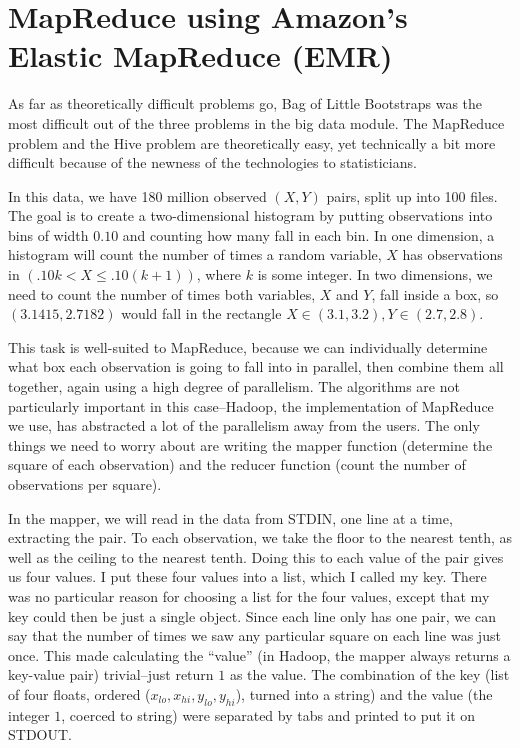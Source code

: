 \documentclass[12pt]{article}
\begin{document}
\section*{MapReduce using Amazon's Elastic MapReduce (EMR)}
As far as theoretically difficult problems go, Bag of Little Bootstraps was the most difficult out of the three problems in the big data module. The MapReduce problem and the Hive problem are theoretically easy, yet technically a bit more difficult because of the newness of the technologies to statisticians. 

In this data, we have 180 million observed $(X,Y)$ pairs, split up into 100 files. The goal is to create a two-dimensional histogram by putting observations into bins of width $0.10$ and counting how many fall in each bin. In one dimension, a histogram will count the number of times a random variable, $X$ has observations in $(.10k < X \leq .10(k+1))$, where $k$ is some integer. In two dimensions, we need to count the number of times both variables, $X$ and $Y$, fall inside a box, so $(3.1415, 2.7182)$ would fall in the rectangle $X \in (3.1, 3.2), Y \in (2.7, 2.8)$. 

This task is well-suited to MapReduce, because we can individually determine what box each observation is going to fall into in parallel, then combine them all together, again using a high degree of parallelism. The algorithms are not particularly important in this case--Hadoop, the implementation of MapReduce we use, has abstracted a lot of the parallelism away from the users. The only things we need to worry about are writing the mapper function (determine the square of each observation) and the reducer function (count the number of observations per square).

In the mapper, we will read in the data from STDIN, one line at a time, extracting the pair. To each observation, we take the floor to the nearest tenth, as well as the ceiling to the nearest tenth. Doing this to each value of the pair gives us four values. I put these four values into a list, which I called my key. There was no particular reason for choosing a list for the four values, except that my key could then be just a single object. Since each line only has one pair, we can say that the number of times we saw any particular square on each line was just once. This made calculating the ``value'' (in Hadoop, the mapper always returns a key-value pair) trivial--just return $1$ as the value. The combination of the key (list of four floats, ordered ($x_{lo}, x_{hi}, y_{lo}, y_{hi}$), turned into a string) and the value (the integer $1$, coerced to string) were separated by tabs and printed to put it on STDOUT.
\end{document}
